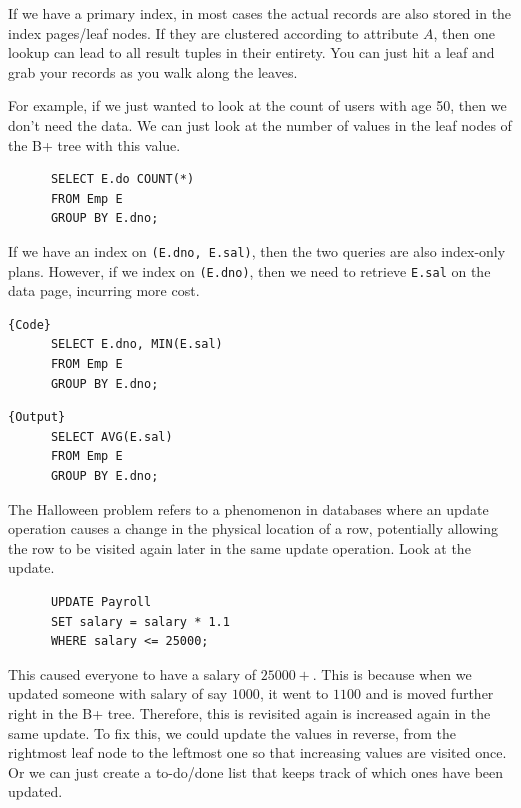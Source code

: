   \begin{example}
    If we have a primary index, in most cases the actual records are also stored in the index pages/leaf nodes. If they are clustered according to attribute $A$, then one lookup can lead to all result tuples in their entirety. You can just hit a leaf and grab your records as you walk along the leaves. 
  \end{example}

  \begin{example}
    For example, if we just wanted to look at the count of users with age 50, then we don't need the data. We can just look at the number of values in the leaf nodes of the B+ tree with this value. 
    \begin{lstlisting}
      SELECT E.do COUNT(*) 
      FROM Emp E 
      GROUP BY E.dno;
    \end{lstlisting}

    If we have an index on \texttt{(E.dno, E.sal)}, then the two queries are also index-only plans. However, if we index on \texttt{(E.dno)}, then we need to retrieve \texttt{E.sal} on the data page, incurring more cost. 

    \noindent\begin{minipage}{.5\textwidth}
    \begin{lstlisting}[]{Code}
      SELECT E.dno, MIN(E.sal) 
      FROM Emp E 
      GROUP BY E.dno; 
    \end{lstlisting}
    \end{minipage}
    \hfill
    \begin{minipage}{.49\textwidth}
    \begin{lstlisting}[]{Output}
      SELECT AVG(E.sal) 
      FROM Emp E 
      GROUP BY E.dno;
    \end{lstlisting}
    \end{minipage}
  \end{example}

  \begin{example}
    The Halloween problem refers to a phenomenon in databases where an update operation causes a change in the physical location of a row, potentially allowing the row to be visited again later in the same update operation. Look at the update. 
    \begin{lstlisting}
      UPDATE Payroll 
      SET salary = salary * 1.1 
      WHERE salary <= 25000;
    \end{lstlisting}
    This caused everyone to have a salary of $25000+$. This is because when we updated someone with salary of say $1000$, it went to $1100$ and is moved further right in the B+ tree. Therefore, this is revisited again is increased again in the same update. To fix this, we could update the values in reverse, from the rightmost leaf node to the leftmost one so that increasing values are visited once. Or we can just create a to-do/done list that keeps track of which ones have been updated. 
  \end{example}

